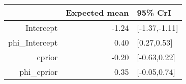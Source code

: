 \begin{tabular}{rrl}
  \hline
 & Expected mean & 95\% CrI \\ 
  \hline
Intercept & -1.24 & [-1.37,-1.11] \\ 
  phi\_Intercept & 0.40 & [0.27,0.53] \\ 
  cprior & -0.20 & [-0.63,0.22] \\ 
  phi\_cprior & 0.35 & [-0.05,0.74] \\ 
   \hline
\end{tabular}

